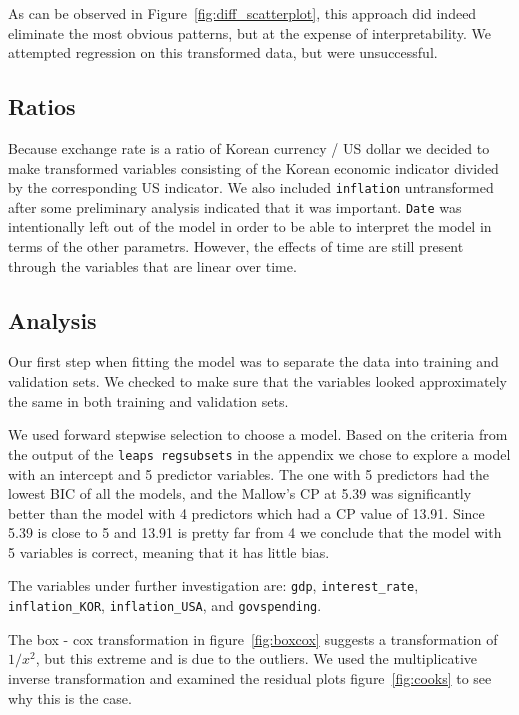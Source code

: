 \documentclass[12pt]{article}
\begin{document}
As can be observed in Figure~\ref{fig:diff_scatterplot},
this approach did indeed eliminate the most obvious patterns, but 
at the expense of interpretability. We attempted regression on this
transformed data, but were unsuccessful.

\subsection{Ratios}

Because exchange rate is a ratio of Korean currency / US dollar we decided
to make transformed variables consisting of the Korean economic indicator
divided by the corresponding US indicator. We also included
\texttt{inflation} untransformed after some preliminary analysis 
indicated that it was
important. \texttt{Date} was intentionally left out of the model in order
to be able to interpret the model in terms of the other parametrs. However,
the effects of time are still present through the variables that are linear
over time.

\subsection{Analysis}

Our first step when fitting the model was to separate the data into
training and validation sets. We checked to make sure that the variables
looked approximately the same in both training and validation sets.

We used forward stepwise selection to choose a model. 
Based on the criteria from the output of the \texttt{leaps regsubsets}
in the appendix we chose to explore a
model with an intercept and 5 predictor variables. The one with 5
predictors had the lowest BIC of all the models, and the Mallow's CP at
5.39 was significantly better than the model with 4 predictors which had a
CP value of 13.91. Since 5.39 is close to 5 and 13.91 is pretty far from 4
we conclude that the model with 5 variables is correct, meaning that it has
little bias.

The variables under further investigation are:
\texttt{gdp}, \texttt{interest\_rate}, \texttt{inflation\_KOR}, 
\texttt{inflation\_USA}, and \texttt{govspending}.

The box - cox transformation in figure~\ref{fig:boxcox} suggests a
transformation of $1 / x^2$, but this extreme and is due to the outliers.
We used the multiplicative inverse transformation and examined the
residual plots figure~\ref{fig:cooks} to see why this is the case. 
\end{document}
